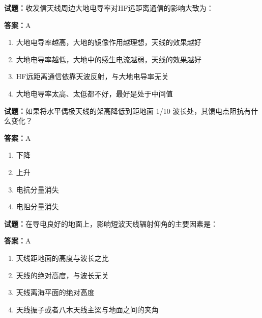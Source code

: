 \documentclass{ctexbook}
\begin{document}


\vspace{1em}

\textbf{试题：}收发信天线周边大地电导率对HF远距离通信的影响大致为： 

\textbf{答案：}A 

\begin{enumerate}[leftmargin=3em]
  \item 大地电导率越高，大地的镜像作用越理想，天线的效果越好 

  \item 大地电导率越低，大地中的感生电流越弱，天线的效果越好 

  \item HF远距离通信依靠天波反射，与大地电导率无关 

  \item 大地电导率太高、太低都不好，最好是处于中间值 

\end{enumerate}





\vspace{1em}

\textbf{试题：}如果将水平偶极天线的架高降低到距地面 1/10 波长处，其馈电点阻抗有什么变化？ 

\textbf{答案：}A 


\begin{enumerate}[leftmargin=3em]
  \item 下降 

  \item 上升 

  \item 电抗分量消失 

  \item 电阻分量消失 

\end{enumerate}





\vspace{1em}

\textbf{试题：}在导电良好的地面上，影响短波天线辐射仰角的主要因素是： 

\textbf{答案：}A 

\begin{enumerate}[leftmargin=3em]
  \item 天线距地面的高度与波长之比 

  \item 天线的绝对高度，与波长无关 

  \item 天线离海平面的绝对高度 

  \item 天线振子或者八木天线主梁与地面之间的夹角 

\end{enumerate}
\end{document}
